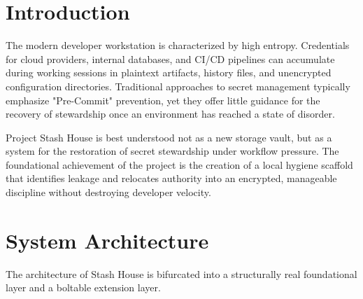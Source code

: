 \documentclass[11pt]{report}
\begin{document}


\cleardoublepage

\tableofcontents
\thispagestyle{empty}
\cleardoublepage
\setcounter{page}{1}


\section{Introduction}
The modern developer workstation is characterized by high entropy. Credentials for cloud providers, internal databases, and CI/CD pipelines can accumulate during working sessions in plaintext artifacts, history files, and unencrypted configuration directories. Traditional approaches to secret management typically emphasize "Pre-Commit" prevention, yet they offer little guidance for the recovery of stewardship once an environment has reached a state of disorder.

Project Stash House is best understood not as a new storage vault, but as a system for the restoration of secret stewardship under workflow pressure. The foundational achievement of the project is the creation of a local hygiene scaffold that identifies leakage and relocates authority into an encrypted, manageable discipline without destroying developer velocity.

\section{System Architecture}

The architecture of Stash House is bifurcated into a structurally real foundational layer and a boltable extension layer.\\
\end{document}
